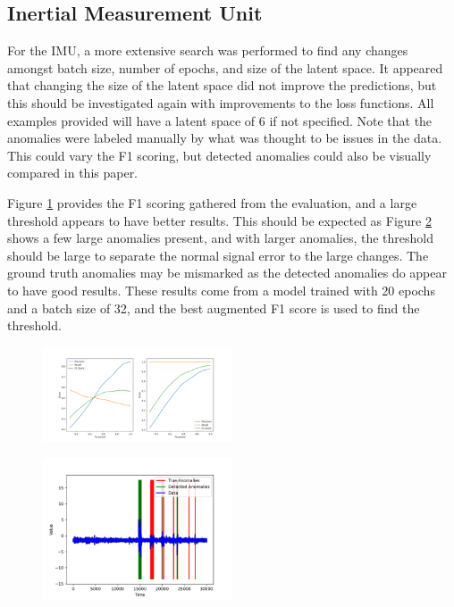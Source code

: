 \documentclass[conference]{IEEEtran}
\begin{document}
\subsection{Inertial Measurement Unit}
For the IMU, a more extensive search was performed to find any changes amongst batch size, number of epochs, and size of the latent space. It appeared that changing the size of the latent space did not improve the predictions, but this should be investigated again with improvements to the loss functions. All examples provided will have a latent space of 6 if not specified. Note that the anomalies were labeled manually by what was thought to be issues in the data. This could vary the F1 scoring, but detected anomalies could also be visually compared in this paper.

Figure \ref{rf_fig_1} provides the F1 scoring gathered from the evaluation, and a large threshold appears to have better results. This should be expected as Figure \ref{rf_fig_2} shows a few large anomalies present, and with larger anomalies, the threshold should be large to separate the normal signal error to the large changes. The ground truth anomalies may be mismarked as the detected anomalies do appear to have good results. These results come from a model trained with 20 epochs and a batch size of 32, and the best augmented F1 score is used to find the threshold.

\begin{figure}[htbp]
    \centering
    \includegraphics[width=0.5\textwidth]{rf_fig_1.png}
    \caption{}
    \label{rf_fig_1}
\end{figure}

\begin{figure}[htbp]
    \centering
    \includegraphics[width=0.5\textwidth]{rf_fig_2.png}
    \caption{}
    \label{rf_fig_2}
\end{figure}
\end{document}
